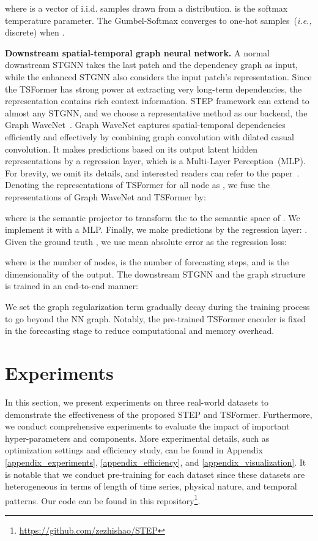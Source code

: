 \documentclass[sigconf]{acmart}
\newcommand{\ie}{\textit{i.e.,}\xspace}
\begin{document}
where  is a vector of i.i.d. samples drawn from a  distribution.
 is the softmax temperature parameter.
The Gumbel-Softmax converges to one-hot samples~(\ie discrete) when .

\noindent\textbf{Downstream spatial-temporal graph neural network.}
A normal downstream STGNN takes the last patch and the dependency graph as input, while the enhanced STGNN also considers the input patch's representation.
Since the TSFormer has strong power at extracting very long-term dependencies, the representation  contains rich context information.
STEP framework can extend to almost any STGNN, and we choose a representative method as our backend, the Graph WaveNet~\cite{GWNet}.
Graph WaveNet captures spatial-temporal dependencies efficiently and effectively by combining graph convolution with dilated casual convolution. 
It makes predictions based on its output latent hidden representations  by a regression layer, which is a Multi-Layer Perception~(MLP).
{\color{black}For brevity, we omit its details, and interested readers can refer to the paper~\cite{GWNet}}.
Denoting the representations  of TSFormer for all node  as , we fuse the representations of Graph WaveNet and TSFormer by:

where  is the semantic projector to transform the  to the semantic space of . We implement it with a MLP.
Finally, we make predictions by the regression layer:  
. 
Given the ground truth , we use mean absolute error as the regression loss:

where  is the number of nodes,  is the number of forecasting steps, and  is the dimensionality of the output.
The downstream STGNN and the graph structure is trained in an end-to-end manner:

We set the graph regularization term  gradually decay during the training process to go beyond the NN graph.
Notably, the pre-trained TSFormer encoder is fixed in the forecasting stage to reduce computational and memory overhead.
 \section{Experiments}


In this section, we present experiments on three real-world datasets to demonstrate the effectiveness of the proposed STEP and TSFormer.
Furthermore, we conduct comprehensive experiments to evaluate the impact of important hyper-parameters and components.
More experimental details, such as optimization settings and efficiency study, can be found in Appendix \ref{appendix_experiments}, \ref{appendix_efficiency}, and \ref{appendix_visualization}.
It is notable that we conduct pre-training for each dataset since these datasets are heterogeneous in terms of length of time series, physical nature, and temporal patterns. 
Our code can be found in this repository\footnote{\url{https://github.com/zezhishao/STEP}}.
\end{document}
